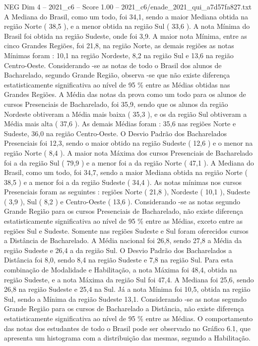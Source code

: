 \begin{textsample}{NEG Dim 4 – 2021\_c6 – Score 1.00 – 2021\_c6/enade\_2021\_qui\_a7d57fa827.txt}
A Mediana do Brasil, como um todo, foi 34,1, sendo a maior Mediana obtida na região Norte ( 38,5 ), e a menor obtida na região Sul ( 33,6 ).
A nota Mínima do Brasil foi obtida na região Sudeste, onde foi 3,9.
A maior nota Mínima, entre as cinco Grandes Regiões, foi 21,8, na região Norte, as demais regiões as notas Mínimas foram : 10,1 na região Nordeste, 8,2 na região Sul e 13,6 na região Centro-Oeste.
Considerando -se as notas de todo o Brasil dos alunos de Bacharelado, segundo Grande Região, observa -se que não existe diferença estatisticamente significativa ao nível de 95 \% entre as Médias obtidas nas Grandes Regiões.
A Média das notas da prova como um todo para os alunos de cursos Presenciais de Bacharelado, foi 35,9, sendo que os alunos da região Nordeste obtiveram a Média mais baixa ( 35,3 ), e os da região Sul obtiveram a Média mais alta ( 37,6 ).
As demais Médias foram : 35,6 nas regiões Norte e Sudeste, 36,0 na região Centro-Oeste.
O Desvio Padrão dos Bacharelados Presenciais foi 12,3, sendo o maior obtido na região Sudeste ( 12,6 ) e o menor na região Norte ( 8,4 ).
A maior nota Máxima dos cursos Presenciais de Bacharelado foi a da região Sul ( 79,9 ) e a menor foi a da região Norte ( 47,1 ).
A Mediana do Brasil, como um todo, foi 34,7, sendo a maior Mediana obtida na região Norte ( 38,5 ) e a menor foi a da região Sudeste ( 34,4 ).
As notas mínimas nos cursos Presenciais foram as seguintes : regiões Norte ( 21,8 ), Nordeste ( 10,1 ), Sudeste ( 3,9 ), Sul ( 8,2 ) e Centro-Oeste ( 13,6 ).
Considerando -se as notas segundo Grande Região para os cursos Presenciais de Bacharelado, não existe diferença estatisticamente significativa ao nível de 95 \% entre as Médias, exceto entre as regiões Sul e Sudeste.
Somente nas regiões Sudeste e Sul foram oferecidos cursos a Distância de Bacharelado.
A Média nacional foi 26,8, sendo 27,8 a Média da região Sudeste e 26,4 a da região Sul.
O Desvio Padrão dos Bacharelados a Distância foi 8,0, sendo 8,4 na região Sudeste e 7,8 na região Sul.
Para esta combinação de Modalidade e Habilitação, a nota Máxima foi 48,4, obtida na região Sudeste, e a nota Máxima da região Sul foi 47,4.
A Mediana foi 25,6, sendo 26,8 na região Sudeste e 25,4 na Sul.
Já a nota Mínima foi 10,5, obtida na região Sul, sendo a Mínima da região Sudeste 13,1.
Considerando -se as notas segundo Grande Região para os cursos de Bacharelado a Distância, não existe diferença estatisticamente significativa ao nível de 95 \% entre as Médias.
O comportamento das notas dos estudantes de todo o Brasil pode ser observado no Gráfico 6.1, que apresenta um histograma com a distribuição das mesmas, segundo a Habilitação.

\end{textsample}

